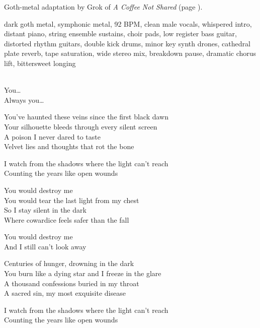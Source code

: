 
\begin{notes}
Goth-metal adaptation by Grok of \emph{A Coffee Not Shared} (page \pageref{sec:a-coffee-not-shared}).
\end{notes}
\begin{style}
dark goth metal, symphonic metal, 92 BPM, clean male vocals, whispered intro, distant piano, string ensemble sustains, choir pads, low register bass guitar, distorted rhythm guitars, double kick drums, minor key synth drones, cathedral plate reverb, tape saturation, wide stereo mix, breakdown pause, dramatic chorus lift, bittersweet longing
\end{style}
\begin{lyrics}
\\
You…\\
Always you…

You’ve haunted these veins since the first black dawn\\
Your silhouette bleeds through every silent screen\\
A poison I never dared to taste\\
Velvet lies and thoughts that rot the bone

I watch from the shadows where the light can’t reach\\
Counting the years like open wounds

You would destroy me\\
You would tear the last light from my chest\\
So I stay silent in the dark\\
Where cowardice feels safer than the fall

You would destroy me\\
And I still can’t look away

Centuries of hunger, drowning in the dark\\
You burn like a dying star and I freeze in the glare\\
A thousand confessions buried in my throat\\
A sacred sin, my most exquisite disease

I watch from the shadows where the light can’t reach\\
Counting the years like open wounds


\end{lyrics}
